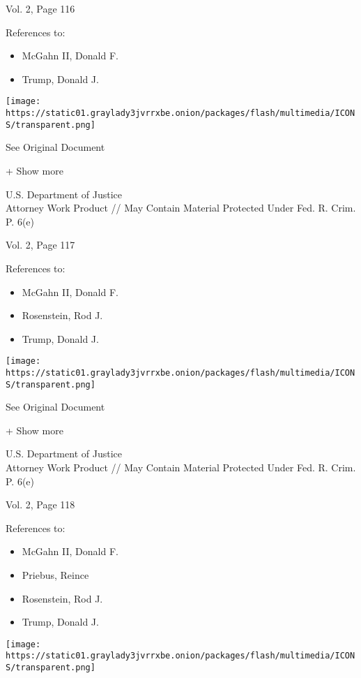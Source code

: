Vol. 2, Page 116

References to:

\begin{itemize}
\tightlist
\item
  McGahn II, Donald F.
\item
  Trump, Donald J.
\end{itemize}

\protect\hyperlink{}{}

\texttt{[image: https://static01.graylady3jvrrxbe.onion/packages/flash/multimedia/ICONS/transparent.png]}

See Original Document

+ Show more

U.S. Department of Justice\\
Attorney Work Product // May Contain Material Protected Under Fed. R.
Crim. P. 6(e)

Vol. 2, Page 117

References to:

\begin{itemize}
\tightlist
\item
  McGahn II, Donald F.
\item
  Rosenstein, Rod J.
\item
  Trump, Donald J.
\end{itemize}

\protect\hyperlink{}{}

\texttt{[image: https://static01.graylady3jvrrxbe.onion/packages/flash/multimedia/ICONS/transparent.png]}

See Original Document

+ Show more

U.S. Department of Justice\\
Attorney Work Product // May Contain Material Protected Under Fed. R.
Crim. P. 6(e)

Vol. 2, Page 118

References to:

\begin{itemize}
\tightlist
\item
  McGahn II, Donald F.
\item
  Priebus, Reince
\item
  Rosenstein, Rod J.
\item
  Trump, Donald J.
\end{itemize}

\protect\hyperlink{}{}

\texttt{[image: https://static01.graylady3jvrrxbe.onion/packages/flash/multimedia/ICONS/transparent.png]}

